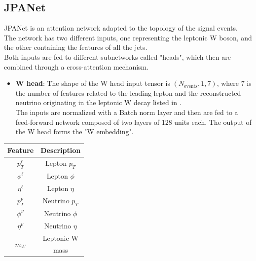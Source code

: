 \subsection{JPANet}
JPANet is an attention network adapted to the topology of the signal events.\\
The network has two different inputs, one representing the leptonic W boson, and the other containing the features of all the jets.\\
Both inputs are fed to different subnetworks called "heads", which then are combined through a cross-attention mechanism.\\




\begin{minipage}{0.6\linewidth}
\begin{itemize}
    \item \textbf{W head}: The shape of the W head input tensor is $(N_{\text{events}},1,7)$, where 7 is the number of features related to the leading lepton and the reconstructed neutrino originating in the leptonic W decay listed in .\\
    The inputs are normalized with a Batch norm layer and then are fed to a feed-forward network composed of two layers of 128 units each.
    The output of the W head forms the "W embedding".
\end{itemize}
\end{minipage}
    \hfill
\begin{minipage}{0.35\linewidth}
        \centering
        \fontsize{11pt}{11pt}\selectfont
        \begin{tabular}{c|c}
            \toprule
             \textbf{Feature}& \textbf{Description} \\
             \midrule
             
             $p_T^\ell$& Lepton $p_T$ \\
             $\phi^\ell$& Lepton $\phi$ \\
             $\eta^\ell$& Lepton $\eta$ \\
             \midrule
             $ p_T^\nu$& Neutrino $p_T$ \\
             $\phi^\nu$& Neutrino $\phi$ \\
             $\eta^\nu$& Neutrino $\eta$ \\
             \midrule
             \multirow{2}{*}{$m_W$} &Leptonic W\\
             &mass\\
             \bottomrule
        \end{tabular}
        \label{tab:Whead}
\end{minipage}
